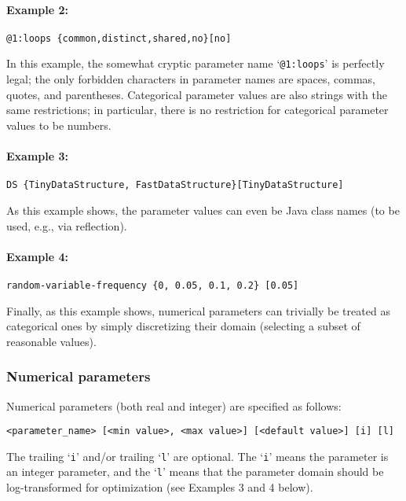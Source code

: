 \documentclass[manual.tex]{subfiles}
\begin{document}
\paragraph{Example 2:}
\begin{verbatim}
@1:loops {common,distinct,shared,no}[no]
\end{verbatim}
In this example, the somewhat cryptic parameter name `\texttt{@1:loops}' is perfectly legal; the only forbidden characters in parameter names are spaces, commas, quotes, and parentheses.
%
Categorical parameter values are also strings with the same restrictions; in particular, there is no restriction for categorical parameter values to be numbers. 

\paragraph{Example 3:}
\begin{verbatim}
DS {TinyDataStructure, FastDataStructure}[TinyDataStructure]
\end{verbatim}
As this example shows, the parameter values can even be Java class names (to be used, e.g., via reflection).

\paragraph{Example 4:}
\begin{verbatim}
random-variable-frequency {0, 0.05, 0.1, 0.2} [0.05]
\end{verbatim}
Finally, as this example shows, numerical parameters can trivially be treated as categorical ones by simply discretizing their domain (selecting a subset of reasonable values).

\subsubsection*{Numerical parameters} \label{sec:numerical-params}
Numerical parameters (both real and integer) are specified as follows:

\begin{verbatim}
<parameter_name> [<min value>, <max value>] [<default value>] [i] [l]
\end{verbatim}
The trailing `\texttt{i}' and/or trailing `\texttt{l}' are optional. The `\texttt{i}' means the parameter is an integer parameter,
and the `\texttt{l}' means that the parameter domain should be log-transformed for optimization (see Examples 3 and 4 below).
\end{document}
